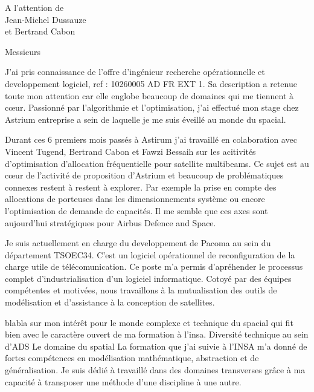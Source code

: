 \documentclass[12pt]{lettre}
\begin{document}
\begin{letter}{A l'attention de\\Jean-Michel Dussauze\\et Bertrand Cabon}
\address{Victor Cameo Ponz\\16 rue Payras\\31000 Toulouse}
\nofax

\opening{Messieurs}
{%
J'ai pris connaissance de l'offre d'ingénieur recherche opérationnelle et
developpement logiciel, ref : 10260005 AD FR EXT 1.
Sa description a retenue toute mon attention car elle englobe beaucoup de
domaines qui me tiennent à c\oe{}ur.
Passionné par l'algorithmie et l'optimisation, j'ai effectué mon stage
chez Astrium entreprise a sein de laquelle je me suis éveillé au monde du spacial.
}

{%
Durant ces 6 premiers mois passés à Astirum j'ai travaillé en colaboration
avec Vincent Tugend, Bertrand Cabon et Fawzi Bessaih sur les acitivités
d'optimisation d'allocation fréquentielle pour satellite multibeams.
Ce sujet est au cœur de l'activité de proposition d'Astrium
et beaucoup de problématiques connexes restent à restent à explorer.
Par exemple la prise en compte des allocations de porteuses dans les
dimensionnements système ou encore l'optimisation de demande de capacités.
Il me semble que ces axes sont aujourd'hui stratégiques pour Airbus Defence and Space.
}

{%
Je suis actuellement en charge du developpement de Pacoma au sein
du département TSOEC34.
C'est un logiciel opérationnel de reconfiguration de la charge utile de
télécomunication.
Ce poste m'a permis d'apréhender le processus complet d'industrialisation d'un
logiciel informatique.
Cotoyé par des équipes compétentes et motivées, nous travaillons à la
mutualisation des outils de modélisation et d'assistance à la conception de
satellites.
}

{%
blabla sur mon intérêt pour le monde complexe et technique du spacial qui fit
bien avec le caractère ouvert de ma formation à l'insa.
Diversité technique au sein d'ADS
Le domaine du spatial
La formation que j'ai suivie à l'INSA m'a donné de fortes compétences en
modélisation mathématique, abstraction et de généralisation.
Je suis dédié à travaillé dans des domaines transverses grâce à ma
capacité à transposer une méthode d'une discipline à une autre.
}


\end{letter}
\end{document}
